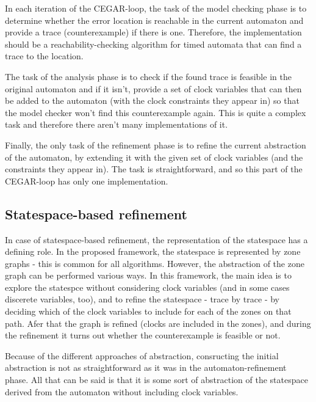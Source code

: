 In each iteration of the CEGAR-loop, the task of the model checking phase is to determine whether the error location is reachable in the current automaton and provide a trace (counterexample) if there is one. Therefore, the implementation should be a reachability-checking algorithm for timed automata that can find a trace to the location.

The task of the analysis phase is to check if the found trace is feasible in the original automaton and if it isn't, provide a set of clock variables that can then be added to the automaton (with the clock constraints they appear in) so that the model checker won't find this counterexample again. This is quite a complex task and therefore there aren't many implementations of it.

Finally, the only task of the refinement phase is to refine the current abstraction of the automaton, by extending it with the given set of clock variables (and the constraints they appear in). The task is straightforward, and so this part of the CEGAR-loop has only one implementation.



\subsection{Statespace-based refinement}

In case of statespace-based refinement, the representation of the statespace has a defining role. In the proposed framework, the statespace is represented by zone graphs - this is common for all algorithms. However, the abstraction of the zone graph can be performed various ways. In this framework, the main idea is to explore the statespce without considering clock variables (and in some cases discerete variables, too), and to refine the statespace - trace by trace - by deciding which of the clock variables to include for each of the zones on that path. Afer that the graph is refined (clocks are included in the zones), and during the refinement it turns out whether the counterexample is feasible or not.  

Because of the different approaches of abstraction, consructing the initial abstraction is not as straightforward as it was in the automaton-refinement phase. All that can be said is that it is some sort of abstraction of the statespace derived from the automaton without including clock variables.

